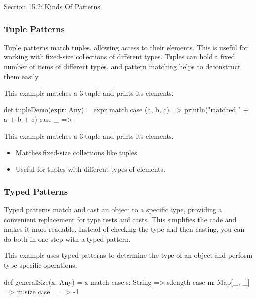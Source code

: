 \begin{notes}{Section 15.2: Kinds Of Patterns}
\begin{highlight}
    \end{highlight}
    
    \subsubsection*{Tuple Patterns}
    
    Tuple patterns match tuples, allowing access to their elements. This is useful for working with fixed-size collections of different types. Tuples can hold a fixed number of items of different 
    types, and pattern matching helps to deconstruct them easily.
    
    \begin{highlight}
    
    This example matches a 3-tuple and prints its elements.
    
    \begin{code}[Scala]
    def tupleDemo(expr: Any) = expr match {
        case (a, b, c) => println("matched " + a + b + c)
        case _ =>
    }
    \end{code}
    
    This example matches a 3-tuple and prints its elements.
    
    \begin{itemize}
        \item Matches fixed-size collections like tuples.
        \item Useful for tuples with different types of elements.
    \end{itemize}
    
    \end{highlight}
    
    \subsubsection*{Typed Patterns}
    
    Typed patterns match and cast an object to a specific type, providing a convenient replacement for type tests and casts. This simplifies the code and makes it more readable. Instead of checking 
    the type and then casting, you can do both in one step with a typed pattern.
    
    \begin{highlight}
    
    This example uses typed patterns to determine the type of an object and perform type-specific operations.
    
    \begin{code}[Scala]
    def generalSize(x: Any) = x match {
        case s: String => s.length
        case m: Map[_, _] => m.size
        case _ => -1
    }
    \end{code}
    

\end{highlight}
\end{notes}
